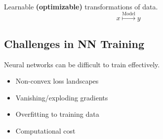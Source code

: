 \begin{definition}
    Learnable \textbf{(optimizable)} transformations of data.
    \begin{equation}
        x \overset{\text{Model}}{\mapsto} y
    \end{equation}
\end{definition}

\subsection{Challenges in NN Training}
\begin{notes}
    Neural networks can be difficult to train effectively.
    \begin{itemize}
        \item Non-convex loss landscapes
        \item Vanishing/exploding gradients
        \item Overfitting to training data
        \item Computational cost
    \end{itemize}
\end{notes}
\newpage

